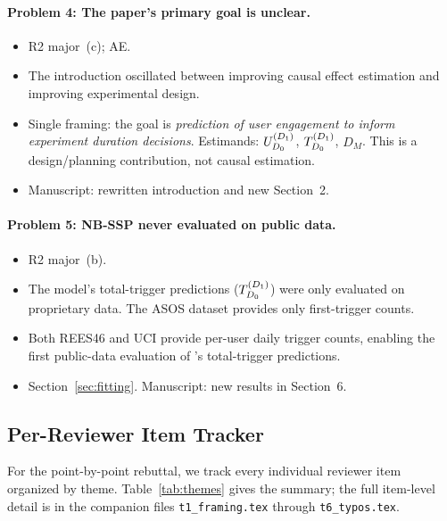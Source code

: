 \paragraph{Problem 4: The paper's primary goal is unclear.}
\begin{itemize}[leftmargin=*]
  \item[\emph{Source:}] R2 major~(c); AE.
  \item[\emph{Problem:}]
        The introduction oscillated between improving causal effect
        estimation and improving experimental design.
  \item[\emph{Solution:}]
        Single framing: the goal is \emph{prediction of user
        engagement to inform experiment duration decisions}.
        Estimands: $U_{D_0}^{(D_1)}$, $T_{D_0}^{(D_1)}$, $D_M$.
        This is a design/planning contribution, not causal estimation.
  \item[\emph{Where:}]
        Manuscript: rewritten introduction and new Section~2.
\end{itemize}

\paragraph{Problem 5: NB-SSP never evaluated on public data.}
\begin{itemize}[leftmargin=*]
  \item[\emph{Source:}] R2 major~(b).
  \item[\emph{Problem:}]
        The \nbmodel{} model's total-trigger predictions ($T_{D_0}^{(D_1)}$)
        were only evaluated on proprietary data.
        The ASOS dataset provides only first-trigger counts.
  \item[\emph{Solution:}]
        Both REES46 and UCI provide per-user daily trigger counts,
        enabling the first public-data evaluation of \nbmodel{}'s
        total-trigger predictions.
  \item[\emph{Where:}]
        Section~\ref{sec:fitting}.
        Manuscript: new results in Section~6.
\end{itemize}


\subsection{Per-Reviewer Item Tracker}
\label{subsec:themes}

For the point-by-point rebuttal, we track every individual
reviewer item organized by theme.
Table~\ref{tab:themes} gives the summary; the full item-level
detail is in the companion files
\texttt{t1\_framing.tex} through \texttt{t6\_typos.tex}.

